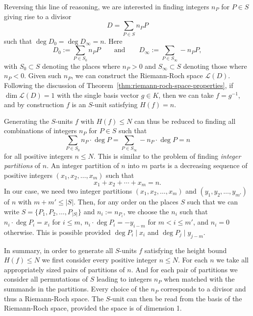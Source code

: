 Reversing this line of reasoning, we are interested in finding integers \(n_{P}\) for \(P \in S\) giving rise to a divisor
\[D = \sum_{P \in S} n_{P} P\]
such that \(\deg{D_{0}} = \deg{D_{\infty}} = n\). Here
\[D_{0} := \sum_{P \in S_{0}} n_{P} P \qquad \text{and} \qquad D_{\infty} := \sum_{P \in S_{\infty}} - n_{P} P,\]
with \(S_{0} \subset S\) denoting the places where \(n_{P} > 0\) and \(S_{\infty} \subset S\) denoting those where \(n_{P} < 0\). Given such \(n_{P}\), we can construct the Riemann-Roch space \(\mathcal{L}(D)\). Following the discussion of Theorem~\ref{thm:riemann-roch-space-properties}, if \(\dim{\mathcal{L}(D)} = 1\) with the single basis vector \(g \in K\), then we can take \(f = g^{-1}\), and by construction \(f\) is an \(S\)-unit satisfying \(H(f) = n\).

Generating the \(S\)-units \(f\) with \(H(f) \leq N\) can thus be reduced to finding all combinations of integers \(n_{P}\) for \(P \in S\) such that
\[\sum_{P \in S_{0}} n_{P} \cdot \deg{P} = \sum_{P \in S_{\infty}} - n_{P} \cdot \deg{P} = n\]
for all positive integers \(n \leq N\). This is similar to the problem of finding \textit{integer partitions} of \(n\). An integer partition of \(n\) into \(m\) parts is a decreasing sequence of positive integers \((x_{1}, x_{2}, \dots, x_{m})\) such that
\[x_{1} + x_{2} + \cdots + x_{m} = n.\]
In our case, we need two integer partitions \((x_{1}, x_{2}, \dots, x_{m})\) and \((y_{1}, y_{2}, \dots, y_{m'})\) of \(n\) with \({m + m' \leq |S|}\). Then, for any order on the places \(S\) such that we can write \(S = \{P_{1}, P_{2}, \dots, P_{|S|}\}\) and \(n_{i} := n_{P_{i}}\), we choose the \(n_{i}\) such that \(n_{i} \cdot \deg{P_{i}} = x_{i}\) for \(i \leq m\), \(n_{i} \cdot \deg{P_{i}} = -y_{i - m}\) for \(m < i \leq m'\), and \(n_{i} = 0\) otherwise. This is possible provided \(\deg{P_{i}} \mid x_{i}\) and \(\deg{P_{j}} \mid y_{j - m}\).

In summary, in order to generate all \(S\)-units \(f\) satisfying the height bound \(H(f) \leq N\) we first consider every positive integer \(n \leq N\). For each \(n\) we take all appropriately sized pairs of partitions of \(n\). And for each pair of partitions we consider all permutations of \(S\) leading to integers \(n_{P}\) when matched with the summands in the partitions. Every choice of the \(n_{P}\) corresponds to a divisor and thus a Riemann-Roch space. The \(S\)-unit can then be read from the basis of the Riemann-Roch space, provided the space is of dimension 1.

